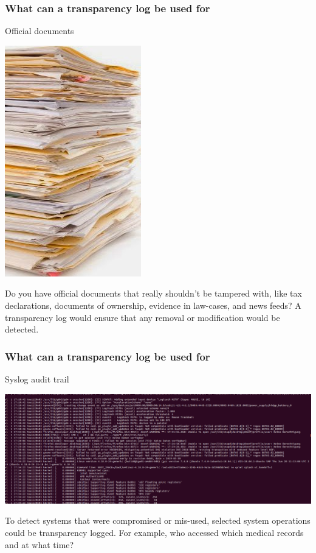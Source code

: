 \begin{frame}
  \frametitle{What can a transparency log be used for}

  \centerline{Official documents}

  \centerline{\includegraphics[scale=.2]{img/stack-of-files-rs}}
  \pause

  Do you have official documents that really shouldn't be tampered
  with, like tax declarations, documents of ownership, evidence in
  law-cases, and news feeds? A transparency log would ensure that any
  removal or modification would be detected.

\end{frame}

\begin{frame}
  \frametitle{What can a transparency log be used for}

  \centerline{Syslog audit trail}

  \centerline{\includegraphics[scale=.1]{img/syslog}}
  \pause

  To detect systems that were compromised or mis-used, selected system
  operations could be transparency logged. For example, who accessed
  which medical records and at what time?
\end{frame}

